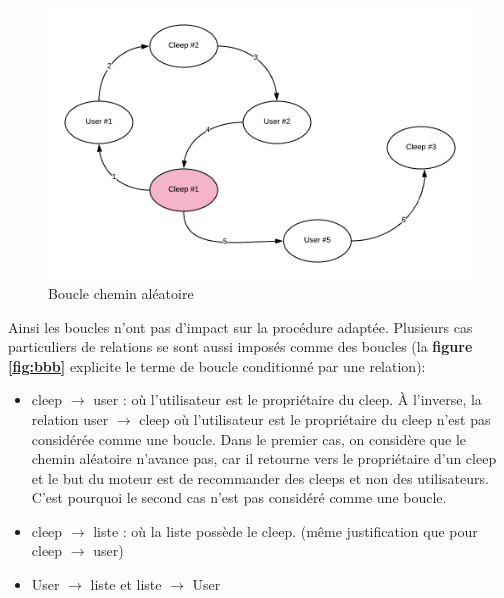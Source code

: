 \documentclass{article} %
\begin{document}
{\begin{figure}[!h]
 \centering
 \includegraphics[keepaspectratio = true,scale=0.7]{boucle}
 \caption{Boucle chemin aléatoire}
 \label{fig:boucle}
\end{figure}
\newpage
Ainsi les boucles n'ont pas d'impact sur la procédure adaptée. Plusieurs cas particuliers de relations se sont aussi imposés comme des boucles (la \textbf{figure \ref{fig:bbb}} explicite le terme de boucle conditionné par une relation):
\begin{itemize}
 \item cleep $\rightarrow$ user : où l'utilisateur est le propriétaire du cleep. À l'inverse, la relation user $\rightarrow$ cleep où l'utilisateur est le propriétaire du cleep n'est pas considérée comme une boucle. Dans le premier cas, on considère que le chemin aléatoire n'avance pas, car il retourne vers le propriétaire d'un cleep et le but du moteur est de recommander des cleeps et non des utilisateurs. C'est pourquoi le second cas n'est pas considéré comme une boucle.
 \item cleep $\rightarrow$ liste : où la liste possède le cleep. (même justification que pour cleep $\rightarrow$ user)
 \item User  $\rightarrow$  liste et liste  $\rightarrow$  User
\end{itemize}

}
\end{document}

